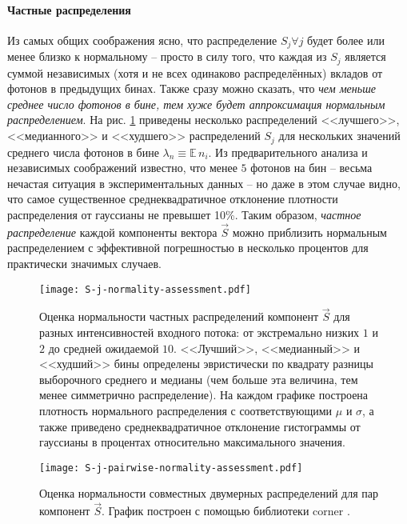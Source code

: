 \paragraph{Частные распределения}

Из самых общих соображения ясно, что распределение $S_j \forall j$ будет более или менее близко к нормальному -- просто в силу того, что каждая из $S_j$ является суммой независимых (хотя и не всех одинаково распределённых) вкладов от фотонов в предыдущих бинах. Также сразу можно сказать, что \textit{чем меньше среднее число фотонов в бине, тем хуже будет аппроксимация нормальным распределением}. На рис. \ref{pic:s-j-norm-assess} приведены несколько распределений <<лучшего>>, <<медианного>> и <<худшего>> распределений $S_j$ для нескольких значений среднего числа фотонов в бине $\lambda_n \equiv \mathbb{E} \, n_i$. Из предварительного анализа и независимых соображений известно, что менее $5$ фотонов на бин -- весьма нечастая ситуация в экспериментальных данных -- но даже в этом случае видно, что самое существенное среднеквадратичное отклонение плотности распределения от гауссианы не превышет 10\%. Таким образом, \textit{частное распределение} каждой компоненты вектора $\vec{S}$ можно приблизить нормальным распределением с эффективной погрешностью в несколько процентов для практически значимых случаев.

\begin{figure}
	\centering
	\texttt{[image: S-j-normality-assessment.pdf]}
	\caption{Оценка нормальности частных распределений компонент $\vec{S}$ для разных интенсивностей входного потока: от экстремально низких $1$ и $2$ до средней ожидаемой $10$. <<Лучший>>, <<медианный>> и <<худший>> бины определены эвристически по квадрату разницы выборочного среднего и медианы (чем больше эта величина, тем менее симметрично распределение). На каждом графике построена плотность нормального распределения с соответствующими $\mu$ и $\sigma$, а также приведено среднеквадратичное отклонение гистограммы от гауссианы в процентах относительно максимального значения.}
	\label{pic:s-j-norm-assess}
\end{figure}

\begin{figure}
	\centering
	\texttt{[image: S-j-pairwise-normality-assessment.pdf]}
	\caption{Оценка нормальности совместных двумерных распределений для пар компонент $\vec{S}$. График построен с помощью библиотеки corner \cite{ForemanMackey2016}.}
	\label{pic:s-j-pairwise-norm-assess}
\end{figure}

